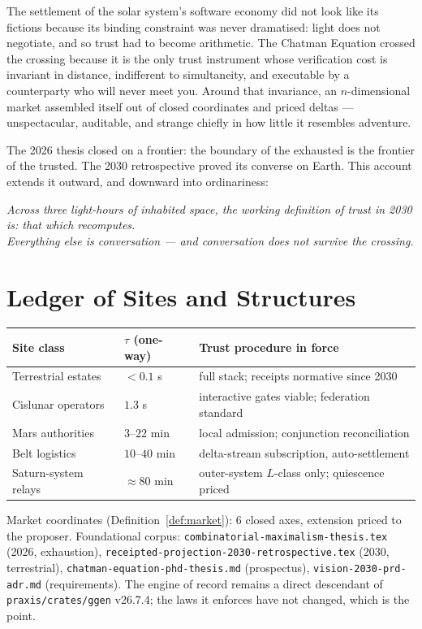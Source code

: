 \documentclass[11pt,a4paper]{report}
\theoremstyle{definition}
\theoremstyle{remark}
\newcommand{\lat}{\tau}
\begin{document}
The settlement of the solar system's software economy did not look like
its fictions because its binding constraint was never dramatised: light
does not negotiate, and so trust had to become arithmetic. The Chatman
Equation crossed the crossing because it is the only trust instrument
whose verification cost is invariant in distance, indifferent to
simultaneity, and executable by a counterparty who will never meet you.
Around that invariance, an $n$-dimensional market assembled itself out of
closed coordinates and priced deltas --- unspectacular, auditable, and
strange chiefly in how little it resembles adventure.

The 2026 thesis closed on a frontier: the boundary of the exhausted is the
frontier of the trusted. The 2030 retrospective proved its converse on
Earth. This account extends it outward, and downward into ordinariness:

\begin{center}
\emph{Across three light-hours of inhabited space, the working
definition of trust in 2030 is: that which recomputes.\\
Everything else is conversation --- and conversation does not
survive the crossing.}
\end{center}

\appendix
\chapter{Ledger of Sites and Structures}

\begin{center}
\begin{tabular}{@{}lll@{}}
\toprule
Site class & $\lat$ (one-way) & Trust procedure in force \\
\midrule
Terrestrial estates & $<0.1$ s & full stack; receipts normative since 2030 \\
Cislunar operators & $1.3$ s & interactive gates viable; federation standard \\
Mars authorities & $3$--$22$ min & local admission; conjunction reconciliation \\
Belt logistics & $10$--$40$ min & delta-stream subscription, auto-settlement \\
Saturn-system relays & $\approx 80$ min & outer-system $L$-class only; quiescence priced \\
\bottomrule
\end{tabular}
\end{center}

\vspace{1em}
\noindent
Market coordinates (Definition~\ref{def:market}): $6$ closed axes,
extension priced to the proposer. Foundational corpus:
\texttt{combinatorial-maximalism-thesis.tex} (2026, exhaustion),
\texttt{receipted-projection-2030-retrospective.tex} (2030, terrestrial),
\texttt{chatman-equation-phd-thesis.md} (prospectus),
\texttt{vision-2030-prd-adr.md} (requirements). The engine of record
remains a direct descendant of \texttt{praxis/crates/ggen} v26.7.4; the
laws it enforces have not changed, which is the point.
\end{document}
